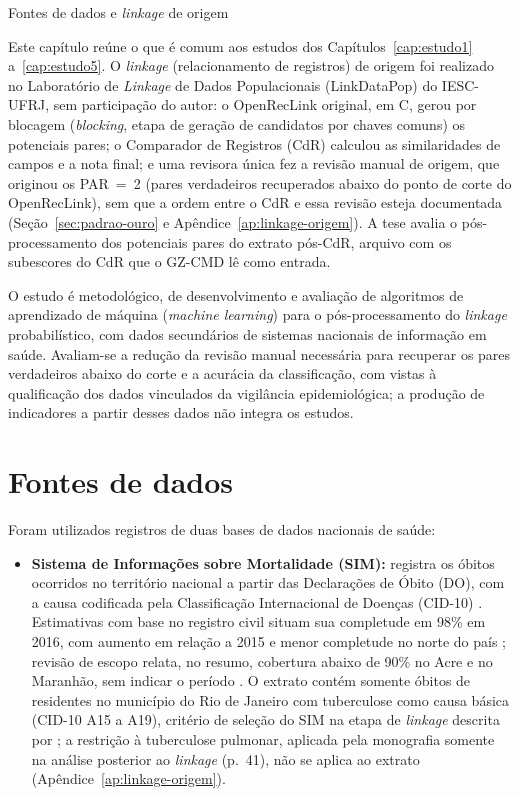 \begin{chapter}{Fontes de dados e \textit{linkage} de origem}\label{cap:dados}

Este capítulo reúne o que é comum aos estudos dos Capítulos~\ref{cap:estudo1} a~\ref{cap:estudo5}. O \textit{linkage} (relacionamento de registros) de origem foi realizado no Laboratório de \textit{Linkage} de Dados Populacionais (LinkDataPop) do IESC-UFRJ, sem participação do autor: o OpenRecLink original, em C, gerou por blocagem (\textit{blocking}, etapa de geração de candidatos por chaves comuns) os potenciais pares; o Comparador de Registros (CdR) calculou as similaridades de campos e a nota final; e uma revisora única fez a revisão manual de origem, que originou os PAR~=~2 (pares verdadeiros recuperados abaixo do ponto de corte do OpenRecLink), sem que a ordem entre o CdR e essa revisão esteja documentada (Seção~\ref{sec:padrao-ouro} e Apêndice~\ref{ap:linkage-origem}). A tese avalia o pós-processamento dos potenciais pares do extrato pós-CdR, arquivo com os subescores do CdR que o GZ-CMD lê como entrada.

O estudo é metodológico, de desenvolvimento e avaliação de algoritmos de aprendizado de máquina (\textit{machine learning}) para o pós-processamento do \textit{linkage} probabilístico, com dados secundários de sistemas nacionais de informação em saúde. Avaliam-se a redução da revisão manual necessária para recuperar os pares verdadeiros abaixo do corte e a acurácia da classificação, com vistas à qualificação dos dados vinculados da vigilância epidemiológica; a produção de indicadores a partir desses dados não integra os estudos.

\section{Fontes de dados}\label{sec:fontes-dados}

Foram utilizados registros de duas bases de dados nacionais de saúde:

\begin{itemize}
\item \textbf{Sistema de Informações sobre Mortalidade (SIM):} registra os óbitos ocorridos no território nacional a partir das Declarações de Óbito (DO), com a causa codificada pela Classificação Internacional de Doenças (CID-10) \cite{Jorge2007qualidade}. Estimativas com base no registro civil situam sua completude em 98\% em 2016, com aumento em relação a 2015 e menor completude no norte do país \cite{Costa2020completeness}; revisão de escopo relata, no resumo, cobertura abaixo de 90\% no Acre e no Maranhão, sem indicar o período \cite{Reboucas2025sim}. O extrato contém somente óbitos de residentes no município do Rio de Janeiro com tuberculose como causa básica (CID-10 A15 a A19), critério de seleção do SIM na etapa de \textit{linkage} descrita por ; a restrição à tuberculose pulmonar, aplicada pela monografia somente na análise posterior ao \textit{linkage} (p.~41), não se aplica ao extrato (Apêndice~\ref{ap:linkage-origem}).


\end{itemize}
\end{chapter}
